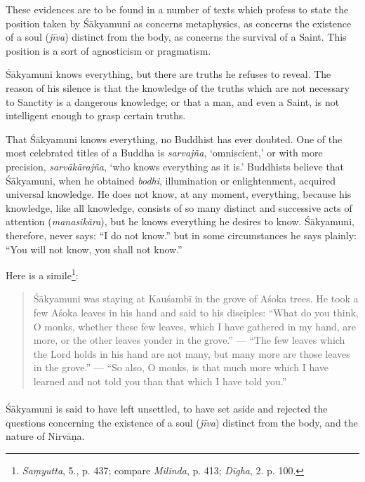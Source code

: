 \documentclass[a4paper, 11pt, oneside, english]{article}
\begin{document}
These evidences are to be found in a number of texts which profess to state the position taken by Śākyamuni as concerns metaphysics, as concerns the existence of a soul (\emph{jīva}) distinct from the body, as concerns the survival of a Saint. This position is a sort of agnosticism or pragmatism.

Śākyamuni knows everything, but there are truths he refuses to reveal. The reason of his silence is that the knowledge of the truths which are not necessary to Sanctity is a dangerous knowledge; or that a man, and even a Saint, is not intelligent enough to grasp certain truths.

That Śākyamuni knows everything, no Buddhist has ever doubted. One of the most celebrated titles of a Buddha is \emph{sarvajña}, `omniscient,' or with more precision, \emph{sarvākārajña}, `who knows everything as it is.' Buddhists believe that Śākyamuni, when he obtained \emph{bodhi}, illumination or enlightenment, acquired universal knowledge. He does not know, at any moment, everything, because his knowledge, like all knowledge, consists of so many distinct and successive acts of attention (\emph{manasikāra}), but he knows everything he desires to know. Śākyamuni, therefore, never says: ``I do not know.'' but in some circumstances he says plainly: ``You will not know, you shall not know.''

Here is a simile\footnote{\emph{Saṃyutta}, 5., p. 437; compare \emph{Milinda}, p. 413; \emph{Dīgha}, 2. p. 100.}:
\begin{quotation}
\small
Śākyamuni was staying at Kauśambī in the grove of Aśoka trees. He took a few Aśoka leaves in his hand and said to his disciples: ``What do you think, O monks, whether these few leaves, which I have gathered in my hand, are more, or the other leaves yonder in the grove.'' --- ``The few leaves which the Lord holds in his hand are not many, but many more are those leaves in the grove.'' --- ``So also, O monks, is that much more which I have learned and not told you than that which I have told you.''
\end{quotation}
\paragraph{}
Śākyamuni is said to have left unsettled, to have set aside and rejected the questions concerning the existence of a soul (\emph{jīva}) distinct from the body, and the nature of Nirvāṇa.
\end{document}
